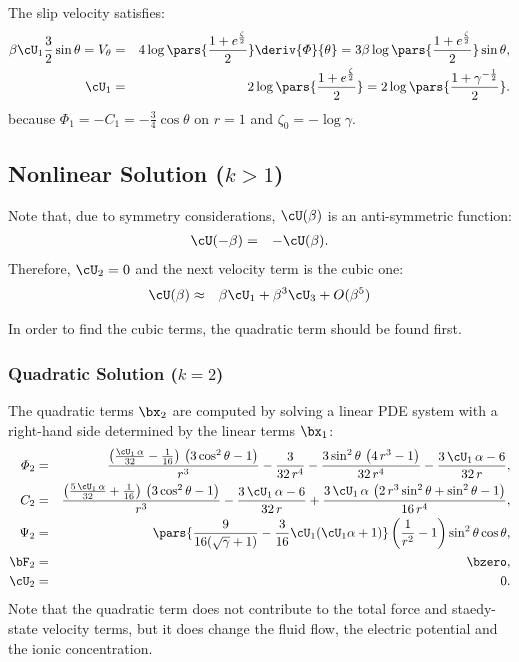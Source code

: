 The slip velocity satisfies:
\begin{eqnarray*}
\beta \cU_1 \frac{3}{2} \sin\theta =
V_\theta &=& 4 \log \pars{\frac{1 + e ^ \frac{\zeta}{2}}{2}} \deriv{\varPhi}{\theta} 
=
 3 \beta \log \pars{\frac{1 + e ^ \frac{\zeta}{2}}{2}} \sin\theta, \\
\cU_1 &=& 2 \log \pars{\frac{1 + e ^ \frac{\zeta}{2}}{2}} 
       =  2 \log \pars{\frac{1 + \gamma ^ {-\frac{1}{2}}}{2}}.
\end{eqnarray*}
because $\varPhi_1 = -C_1 = -\frac{3}{4} \cos\theta$ on $r=1$
and $\zeta_0 = -\log\gamma$.

\subsection{Nonlinear Solution ($k > 1$)}
Note that, due to symmetry considerations, $\cU(\beta)$ is an anti-symmetric function:
\begin{eqnarray*}
\cU(-\beta) &=& -\cU(\beta).
\end{eqnarray*}
Therefore, $\cU_2 = 0$ and the next velocity term is the cubic one:
\begin{eqnarray*}
\cU(\beta) &\approx& \beta \cU_1 + \beta^3 \cU_3 + O(\beta^5)
\end{eqnarray*}

In order to find the cubic terms, the quadratic term should be found first.

\subsubsection{Quadratic Solution ($k = 2$)}
The quadratic terms $\bx_2$ are computed by solving a linear PDE system 
with a right-hand side determined by the linear terms $\bx_1$:
\begin{eqnarray*}
\varPhi_2 &=& \frac{\left(\frac{\cU_1\, \alpha}{32} - \frac{1}{16}\right)\, \left(3\, {\cos^2\theta} - 1\right)}{r^3} - \frac{3}{32\, r^4} - \frac{3\, {\sin^2\theta}\, \left(4\, r^3 - 1\right)}{32\, r^4} - \frac{3\, \cU_1\, \alpha - 6}{32\, r},
\\
C_2 &=& \frac{\left(\frac{5\, \cU_1\, \alpha}{32} + \frac{1}{16}\right)\, \left(3\, {\cos^2\theta} - 1\right)}{r^3} - \frac{3\, \cU_1\, \alpha - 6}{32\, r} + \frac{3\, \cU_1\, \alpha\, \left(2\, r^3\, {\sin^2\theta} + {\sin^2\theta} - 1\right)}{16\, r^4},
\\
\Psi_2 &=& \pars{\frac{9}{16(\sqrt{\gamma}+1)} - \frac{3}{16} \cU_1 (\cU_1 \alpha + 1)}
 \left(\frac{1}{r^2} - 1\right) \sin^2\theta \cos\theta,  \\
\bF_2 &=& \bzero, \\ \cU_2 &=& 0.
\end{eqnarray*}
Note that the quadratic term does not contribute to the total force and staedy-state 
velocity terms, but it does change the fluid flow, 
the electric potential and the ionic concentration.

